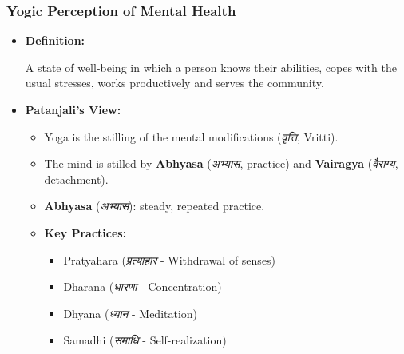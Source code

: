 \begin{frame}[fragile]\frametitle{Yogic Perception of Mental Health}

      \begin{itemize}
        \item \textbf{Definition:}
        
        A state of well-being in which a person knows their abilities, copes with the usual stresses, works productively and serves the community.

        \item \textbf{Patanjali's View:}
        \begin{itemize}
            \item Yoga is the stilling of the mental modifications (\textit{वृत्ति}, Vritti).
            \item The mind is stilled by \textbf{Abhyasa} (\textit{अभ्यास}, practice) and \textbf{Vairagya} (\textit{वैराग्य}, detachment).
            \item \textbf{Abhyasa} (\textit{अभ्यास}): steady, repeated practice.
            \item \textbf{Key Practices:} 
                \begin{itemize}
                    \item Pratyahara (\textit{प्रत्याहार} - Withdrawal of senses)
                    \item Dharana (\textit{धारणा} - Concentration)
                    \item Dhyana (\textit{ध्यान} - Meditation)
                    \item Samadhi (\textit{समाधि} - Self-realization)
                \end{itemize}
        \end{itemize}
      \end{itemize}

\end{frame}

